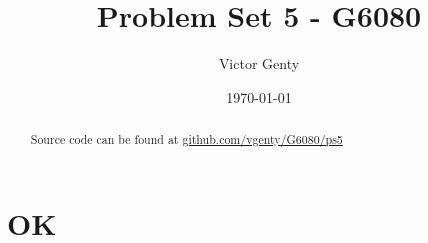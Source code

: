 \documentclass[singlepage,notitlepage,nofootinbib,11pt]{revtex4-1}
\begin{document}
\title{Problem Set 5 - G6080}
\author{Victor Genty}
\date{\today}
\begin{abstract}
\centering
Source code can be found at \href{https://github.com/vgenty/G6080/tree/master/ps5}{github.com/vgenty/G6080/ps5}
\end{abstract}
\maketitle
\section{OK}
\end{document}
